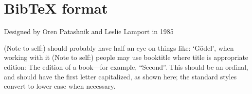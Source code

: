 \section{BibTeX format}

Designed by Oren Patashnik and Leslie Lamport in 1985

(Note to self:) should probably have half an eye on things like:  `G{\"o}del', when working with it
(Note to self:) people may use booktitle where title is appropriate
edition: The edition of a book---for example, ``Second''. This should be an ordinal, and should have the first letter capitalized, as shown here; the standard styles convert to lower case when necessary. \autocite{bibtex_description}

